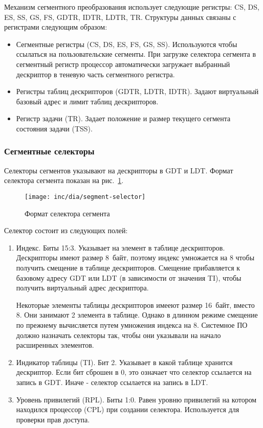 Механизм сегментного преобразования использует следующие регистры: CS, DS, ES, SS, GS, FS, GDTR, IDTR, LDTR, TR.
Структуры данных связаны с регистрами следующим образом:
\begin{itemize}
	\item Сегментные регистры (CS, DS, ES, FS, GS, SS). Используются чтобы ссылаться
		на пользовательские сегменты. При загрузке селектора сегмента в сегментный регистр процессор
		автоматически загружает выбранный дескриптор в теневую часть сегментного регистра.
	\item Регистры таблиц дескрипторов (GDTR, LDTR, IDTR). Задают виртуальный базовый адрес и лимит таблиц дескрипторов.
	\item Регистр задачи (TR). Задает положение и размер текущего сегмента состояния задачи (TSS).
\end{itemize}

\subsubsection*{Сегментные селекторы}
Селекторы сегментов указывают на дескрипторы в GDT и LDT.
Формат селектора сегмента показан на рис.~\ref{fig:segment-selector}.

\begin{figure}[ht!]
  \centering
  \texttt{[image: inc/dia/segment-selector]}
  \caption{Формат селектора сегмента}
  \label{fig:segment-selector}
\end{figure}

Селектор состоит из следующих полей:
\begin{enumerate}[1.]
\item Индекс. Биты 15:3. Указывает на элемент в таблице дескрипторов.
	Дескрипторы имеют размер 8~байт, поэтому индекс умножается на 8
	чтобы получить смещение в таблице дескрипторов. Смещение прибавляется
	к базовому адресу GDT или LDT (в зависимости от значения TI), чтобы получить
	виртуальный адрес дескриптора.

	Некоторые элементы таблицы дескрипторов имееют размер 16~байт, вместо 8.
	Они занимают 2 элемента в таблице. Однако в длинном режиме смещение по
	прежнему вычисляется путем умножения индекса на 8. Системное ПО должно
	назначать селекторы так, чтобы они указывали на начало расширенных элементов.
\item Индикатор таблицы (TI). Бит 2. Указывает в какой таблице хранится дескриптор.
	Если бит сброшен в 0, это означает что селектор ссылается на запись в GDT.
	Иначе - селектор ссылается на запись в LDT.
\item Уровень привилегий (RPL). Биты 1:0. Равен уровню привилегий на котором
	находился процессор (CPL) при создании селектора. Используется для проверки прав доступа.
\end{enumerate}

